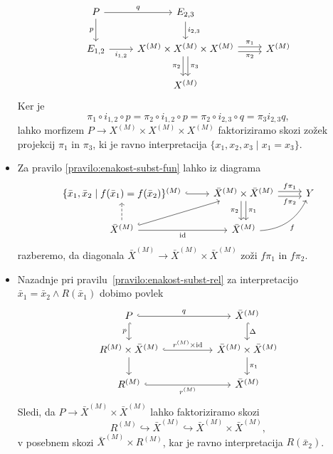 \documentclass[../kategoricna_logika.tex]{subfiles}
\begin{document}
\begin{dokaz}
\begin{itemize}
\begin{equation*}
\begin{tikzcd}
        P \ar[d, "p"'] \ar[r, "q"] & E_{2,3} \ar[d, "i_{2,3}"] \\
        E_{1,2} \ar[r, "i_{1,2}"'] & X^{(M)} \times X^{(M)} \times
        X^{(M)} \ar[d, shift left, "\pi_3"] \ar[d, shift right,
        "\pi_2"'] \ar[r, shift left, "\pi_1"]
        \ar[r, shift right, "\pi_2"'] & X^{(M)} \\
        & X^{(M)}
      \end{tikzcd}
    \end{equation*}
    Ker je
    \[ \pi_1 \circ i_{1,2} \circ p = \pi_2 \circ i_{1,2} \circ p =
      \pi_2 \circ i_{2,3} \circ q = \pi_3i_{2,3}q,\]
    lahko morfizem
    $P \to X^{(M)} \times X^{(M)} \times X^{(M)}$ faktoriziramo skozi
    zožek projekcij $\pi_1$ in $\pi_3$, ki je ravno interpretacija
    $\{x_1, x_2, x_3 \mid x_1 = x_3\}$.
  \item Za pravilo \ref{pravilo:enakost-subst-fun} lahko iz diagrama
    \begin{equation*}
      \begin{tikzcd}
        \{\bar{x}_1, \bar{x}_2 \mid f(\bar{x}_1) =
        f(\bar{x}_2)\}^{(M)} \ar[r, hook] & \bar{X}^{(M)} \times
        \bar{X}^{(M)} \ar[r, shift left, "f \pi_1"] \ar[r, shift
        right, "f \pi_2"']
        \ar[d, shift left, "\pi_1"] \ar[d, shift right, "\pi_2"'] & Y \\
        \bar{X}^{(M)} \ar[u, dashed] \ar[ur, hook] \ar[r, "
        \mathrm{id}"'] & \bar{X}^{(M)} \ar[ur, bend right, "f"']
      \end{tikzcd}
    \end{equation*}
    razberemo, da diagonala
    $\bar{X}^{(M)} \to \bar{X}^{(M)} \times \bar{X}^{(M)}$ zoži
    $f \pi_1$ in $f \pi_2$.
  \item Nazadnje pri pravilu~\ref{pravilo:enakost-subst-rel} za
    interpretacijo $\bar{x}_1 = \bar{x}_2 \land R(\bar{x}_1)$ dobimo povlek
    \begin{equation*}
      \begin{tikzcd}[column sep=5em]
        P \ar[d, hook, "p"'] \ar[r, hook, "q"] & \bar{X}^{(M)} \ar[d, hook, "\Delta"] \\
        R^{(M)} \times \bar{X}^{(M)} \ar[d] \ar[r, hook, "r^{(M)}
        \times \mathrm{id}"] &
        \bar{X}^{(M)} \times \bar{X}^{(M)} \ar[d, "\pi_1"] \\
        R^{(M)} \ar[r, hook, "r^{(M)}"'] & \bar{X}^{(M)}
      \end{tikzcd}
    \end{equation*}
    Sledi, da $P \to \bar{X}^{(M)} \times \bar{X}^{(M)}$ lahko
    faktoriziramo skozi
    \[R^{(M)} \hookrightarrow \bar{X}^{(M)} \hookrightarrow
      \bar{X}^{(M)} \times \bar{X}^{(M)},\] v posebnem skozi
    $\bar{X}^{(M)} \times R^{(M)}$, kar je ravno interpretacija
    $R(\bar{x}_2)$.\qedhere
  \end{itemize}
\end{dokaz}
%
\end{document}
